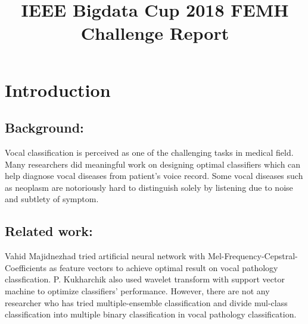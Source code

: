 \documentclass[conference]{IEEEtran}
\begin{document}
\title{IEEE Bigdata Cup 2018 FEMH Challenge Report\\
}

\author{
\and
{}
\and
{}
\and
{}
}

\maketitle

\section{Introduction}
\subsection{Background:}
	Vocal classification is perceived as one of the challenging tasks in medical field. Many researchers did meaningful work on designing optimal classifiers which can help diagnose vocal diseases from patient's voice record. Some vocal diseases such as neoplasm are notoriously hard to distinguish solely by listening due to noise and subtlety of symptom. 
\subsection{Related work:}
	Vahid Majidnezhad tried artificial neural network with Mel-Frequency-Cepstral-Coefficients as feature vectors to achieve optimal result on vocal pathology classfication\cite{b5}. P. Kukharchik also used wavelet transform with support vector machine to optimize classifiers' performance\cite{b4}. However, there are not any researcher who has tried multiple-ensemble classification and divide mul-class classification into multiple binary classification in vocal pathology classification.
	
\end{document}
